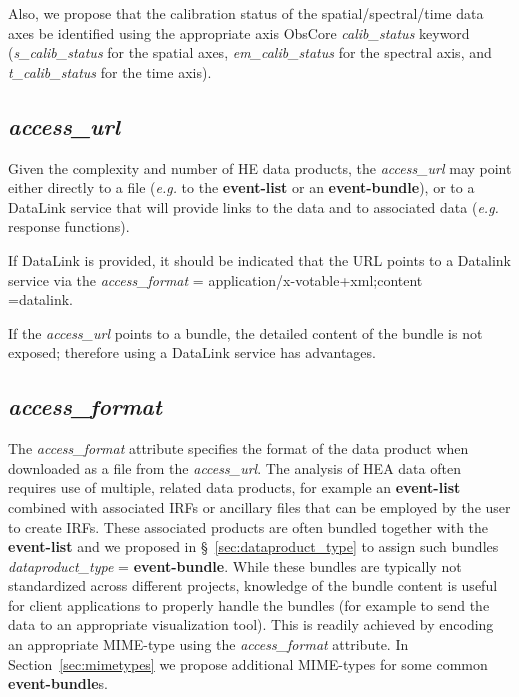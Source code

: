 \documentclass[11pt,a4paper]{ivoa}
\begin{document}
Also, we propose that the calibration status of the spatial/spectral/time data axes be identified using the appropriate axis ObsCore {\em calib\_status\/} keyword ({\em s\_calib\_status\/} for the spatial axes, {\em em\_calib\_status\/} for the spectral axis, and {\em t\_calib\_status\/} for the time axis).

\subsection{{\em access\_url}}

Given the complexity and number of HE data products, the {\em access\_url} may point either directly to a file ({\em e.g.\/} to the {\bf event-list} or an {\bf event-bundle}), or to a DataLink service that will provide links to the data and to associated data ({\em e.g.\/} response functions).

If DataLink is provided, it should be indicated that the URL points to a Datalink service via the {\em access\_format} = application/x-votable+xml;content\\=datalink.

If the {\em access\_url} points to a bundle, the detailed content of the bundle is not exposed; therefore using a DataLink service has advantages.

\subsection{{\em access\_format}}

The {\em access\_format\/} attribute specifies the format of the data product when downloaded as a file from the {\em access\_url\/}.  The analysis of \gls{HEA} data often requires use of multiple, related data products, for example an {\bf event-list} combined with associated \glspl{IRF} or ancillary files that can be employed by the user to create \glspl{IRF}.  These associated products are often bundled together with the {\bf event-list} and we proposed in \S~\ref{sec:dataproduct_type} to assign such bundles {\em dataproduct\_type\/} = {\bf event-bundle}.  While these bundles are typically not standardized across different projects, knowledge of the bundle content is useful for client applications to properly handle the bundles (for example to send the data to an appropriate visualization tool).  This is readily achieved by encoding an appropriate MIME-type using the {\em access\_format\/} attribute.  In Section~\ref{sec:mimetypes} we propose additional MIME-types for some common {\bf event-bundle}s.
\end{document}

